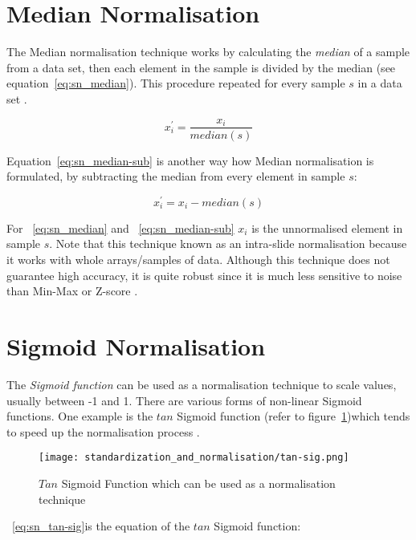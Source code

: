 \section{Median Normalisation}
The Median normalisation technique works by calculating the \emph{median} of a sample from a data set, then each element in the sample is divided by the median (see equation~\ref{eq:sn_median}).  This procedure repeated for every sample $s$ in a data set \citep{jayalakshmi2011statistical}.  

\begin{equation}
\label{eq:sn_median}
x^{\prime}_{i} = \frac{x_{i}}{median(s)}
\end{equation}

Equation~\ref{eq:sn_median-sub} is another way how Median normalisation is formulated, by subtracting the median from every element in sample $s$:

\begin{equation}
\label{eq:sn_median-sub}
x^{\prime}_{i} = x_{i} - median(s)
\end{equation}

For ~\ref{eq:sn_median} and  ~\ref{eq:sn_median-sub} $x_{i}$ is the unnormalised element in sample $s$.  Note that this technique known as an intra-slide normalisation because it works with whole arrays/samples of data.  Although this technique does not guarantee high accuracy, it is quite robust since it is much less sensitive to noise than Min-Max or Z-score \citep{jain2005score}.

\section{Sigmoid Normalisation}
The \emph{Sigmoid function} can be used as a normalisation technique to scale values, usually between -1 and 1.  There are various forms of non-linear Sigmoid functions.  One example is the $tan$ Sigmoid function (refer to figure~\ref{fig:sn_tag-sig})which tends to speed up the normalisation process \citep{jayalakshmi2011statistical}.

\begin{figure}
	\texttt{[image: standardization\_and\_normalisation/tan-sig.png]}
	\caption{$Tan$ Sigmoid Function which can be used as a normalisation technique}
	\label{fig:sn_tag-sig}
\end{figure}

~\ref{eq:sn_tan-sig}is the equation of the $tan$ Sigmoid function:

